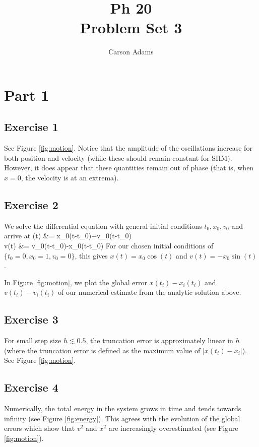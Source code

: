 \documentclass{article}
\def\bal#1\eal{\begin{align}#1\end{align}}
\theoremstyle{definition}
\begin{document}
      \title{Ph 20
      \\Problem Set 3}
      \author{Carson Adams}
      \date{}
      \maketitle
      
\section*{Part 1}      
\subsection*{Exercise 1}
See Figure \ref{fig:motion}. Notice that the amplitude of the oscillations increase for both position and velocity (while these should remain constant for SHM). However, it does appear that these quantities remain out of phase (that is, when $x=0$, the velocity is at an extrema). 

\subsection*{Exercise 2}
We solve the differential equation with general initial conditions $t_0, x_0, v_0$ and arrive at 
\bal
x(t) &= x_0\cos(t-t_0)+v_0\sin(t-t_0)\\
v(t) &= v_0\cos(t-t_0)-x_0\sin(t-t_0)
\eal
For our chosen initial conditions of $\{t_0=0,x_0 = 1, v_0=0\}$, this gives $x(t) = x_0\cos(t)$ and $v(t) = -x_0\sin(t)$. 
\par In Figure \ref{fig:motion}, we plot the global error $x(t_i)-x_i(t_i)$ and $v(t_i)-v_i(t_i)$ of our numerical estimate from the analytic solution above. 

\subsection*{Exercise 3}
For small step size $h\lesssim 0.5$, the truncation error is approximately linear in $h$ (where the truncation error is defined as the maximum value of $|x(t_i)-x_i|$). See Figure \ref{fig:motion}.

\subsection*{Exercise 4}
Numerically, the total energy in the system grows in time and tends towards infinity (see Figure \ref{fig:energy}). This agrees with the evolution of the global errors which show that $v^2$ and $x^2$ are increasingly overestimated (see Figure \ref{fig:motion}). 
\end{document}
